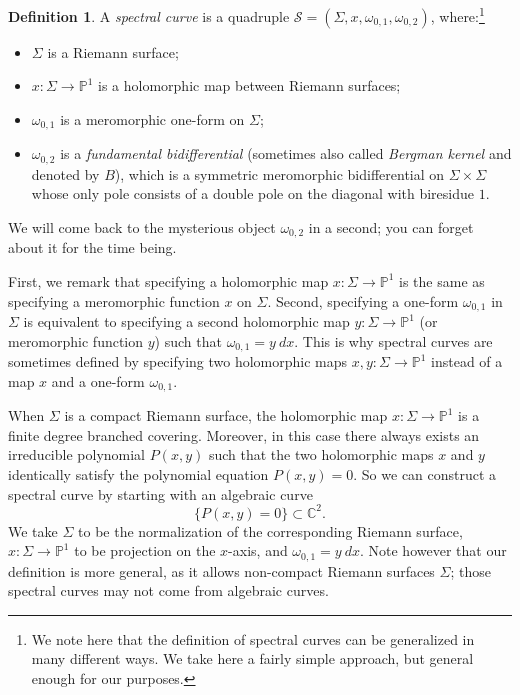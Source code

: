 \documentclass[reqno,oneside,11pt]{amsart}
\theoremstyle{plain}
\theoremstyle{definition}
\newtheorem{definition}[theorem]{Definition}
\theoremstyle{remark}
\numberwithin{equation}{section}
\begin{document}
\begin{definition}\label{d:sc}
A \emph{spectral curve} is a quadruple $\mathcal{S} = (\Sigma,x,\omega_{0,1}, \omega_{0,2})$, where:\footnote{We note here that the definition of spectral curves can be generalized in many different ways. We take here a fairly simple approach, but general enough for our purposes.}
\begin{itemize}
\item $\Sigma$ is a Riemann surface;
\item $x: \Sigma \to \mathbb{P}^1$ is a holomorphic map between Riemann surfaces;
\item $\omega_{0,1}$ is a meromorphic one-form on $\Sigma$;
\item $\omega_{0,2}$ is a \emph{fundamental bidifferential} (sometimes also called \emph{Bergman kernel} and denoted by $B$), which is a symmetric meromorphic bidifferential on $\Sigma \times \Sigma$ whose only pole consists of a double pole on the diagonal with biresidue $1$. 
\end{itemize}
\end{definition}
We will come back to the mysterious object $\omega_{0,2}$ in a second; you can forget about it for the time being.

First, we remark that specifying a holomorphic map $x: \Sigma \to \mathbb{P}^1$ is the same as specifying a meromorphic function $x$ on $\Sigma$. Second, specifying a one-form $\omega_{0,1}$ in $\Sigma$ is equivalent to specifying a second holomorphic map $y : \Sigma \to \mathbb{P}^1$ (or meromorphic function $y$) such that $\omega_{0,1} = y \ dx$. This is why spectral curves are sometimes defined by specifying two holomorphic maps $x,y: \Sigma \to \mathbb{P}^1$ instead of a map $x$ and a one-form $\omega_{0,1}$. 

When $\Sigma$ is a compact Riemann surface, the holomorphic map $x: \Sigma \to \mathbb{P}^1$ is a finite degree branched covering. Moreover, in this case there always exists an irreducible polynomial $P(x,y)$ such that the two holomorphic maps $x$ and $y$ identically satisfy the polynomial equation $P(x,y) = 0$.
So we can construct a spectral curve by starting with an algebraic curve 
\begin{equation}\label{eq:alg}
\{ P(x,y) = 0 \} \subset \mathbb{C}^2.
\end{equation} 
We take $\Sigma$ to be the normalization of the corresponding Riemann surface, $x: \Sigma \to \mathbb{P}^1$ to be projection on the $x$-axis, and $\omega_{0,1} =  y\ dx$. Note however that our definition is more general, as it allows non-compact Riemann surfaces $\Sigma$; those spectral curves may not come from algebraic curves.
\end{document}
